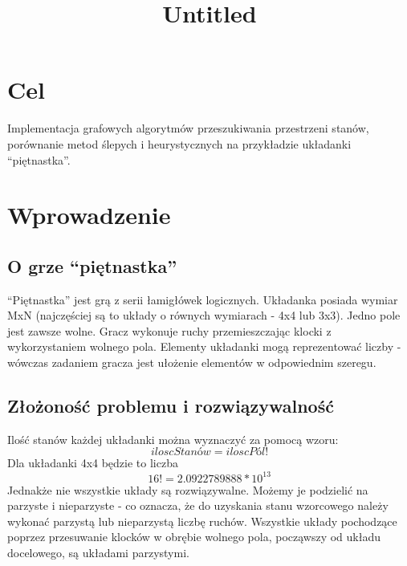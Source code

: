 \documentclass[11pt]{article}
\title{Untitled}
\begin{document}
    
    
    \maketitle
    
    

    
    \hypertarget{cel}{%
\section{Cel}\label{cel}}

Implementacja grafowych algorytmów przeszukiwania przestrzeni stanów,
porównanie metod ślepych i heurystycznych na przykładzie układanki
``piętnastka''.

\hypertarget{wprowadzenie}{%
\section{Wprowadzenie}\label{wprowadzenie}}

\hypertarget{o-grze-piux119tnastka}{%
\subsection{O grze ``piętnastka''}\label{o-grze-piux119tnastka}}

``Piętnastka'' jest grą z serii łamigłówek logicznych. Układanka posiada
wymiar MxN (najczęściej są to układy o równych wymiarach - 4x4 lub 3x3).
Jedno pole jest zawsze wolne. Gracz wykonuje ruchy przemieszczając
klocki z wykorzystaniem wolnego pola. Elementy układanki mogą
reprezentować liczby - wówczas zadaniem gracza jest ułożenie elementów w
odpowiednim szeregu.

\hypertarget{zux142oux17conoux15bux107-problemu-i-rozwiux105zywalnoux15bux107}{%
\subsection{Złożoność problemu i
rozwiązywalność}\label{zux142oux17conoux15bux107-problemu-i-rozwiux105zywalnoux15bux107}}

Ilość stanów każdej układanki można wyznaczyć za pomocą wzoru:
\[ iloscStanów = iloscPól! \] Dla układanki 4x4 będzie to liczba
\[ 16! = 2.0922789888 * 10^{13} \] Jednakże nie wszystkie układy są
rozwiązywalne. Możemy je podzielić na parzyste i nieparzyste - co
oznacza, że do uzyskania stanu wzorcowego należy wykonać parzystą lub
nieparzystą liczbę ruchów. Wszystkie układy pochodzące poprzez
przesuwanie klocków w obrębie wolnego pola, począwszy od układu
docelowego, są układami parzystymi.
\end{document}
